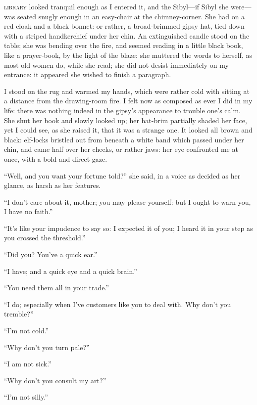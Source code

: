 
 \textsc{library} looked tranquil enough as I entered it, and the Sibyl---if
Sibyl she were---was seated snugly enough in an easy-chair at the
chimney-corner. She had on a red cloak and a black bonnet: or rather, a
broad-brimmed gipsy hat, tied down with a striped handkerchief under her
chin. An extinguished candle stood on the table; she was bending over
the fire, and seemed reading in a little black book, like a prayer-book,
by the light of the blaze: she muttered the words to herself, as most
old women do, while she read; she did not desist immediately on my
entrance: it appeared she wished to finish a paragraph.

I stood on the rug and warmed my hands, which were rather cold with
sitting at a distance from the drawing-room fire. I felt now as
composed as ever I did in my life: there was nothing indeed in the
gipsy's appearance to trouble one's calm. She shut her book and slowly
looked up; her hat-brim partially shaded her face, yet I could see, as
she raised it, that it was a strange one. It looked all brown and
black: elf-locks bristled out from beneath a white band which passed
under her chin, and came half over her cheeks, or rather jaws: her eye
confronted me at once, with a bold and direct gaze.

\enquote{Well, and you want your fortune told?} she said, in a voice as
decided as her glance, as harsh as her features.

\enquote{I don't care about it, mother; you may please yourself: but I
ought to warn you, I have no faith.}

\enquote{It's like your impudence to say so: I expected it of you; I
heard it in your step as you crossed the threshold.}

\enquote{Did you? You've a quick ear.}

\enquote{I have; and a quick eye and a quick brain.}

\enquote{You need them all in your trade.}

\enquote{I do; especially when I've customers like you to deal with. 
Why don't you tremble?}

\enquote{I'm not cold.}

\enquote{Why don't you turn pale?}

\enquote{I am not sick.}

\enquote{Why don't you consult my art?}

\enquote{I'm not silly.}

